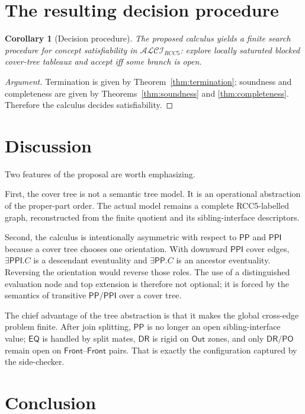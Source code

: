 \documentclass[11pt]{article}
\newtheorem{corollary}[definition]{Corollary}
\theoremstyle{remark}
\newcommand{\DR}{\mathsf{DR}}
\newcommand{\PO}{\mathsf{PO}}
\newcommand{\PP}{\mathsf{PP}}
\newcommand{\PPI}{\mathsf{PPI}}
\newcommand{\EQ}{\mathsf{EQ}}
\newcommand{\Out}{\mathsf{Out}}
\newcommand{\Front}{\mathsf{Front}}
\begin{document}
\section{The resulting decision procedure}

\begin{corollary}[Decision procedure]\label{cor:decision-procedure}
The proposed calculus yields a finite search procedure for concept satisfiability in $\mathcal{ALCI}_{RCC5}$: explore locally saturated blocked cover-tree tableaux and accept iff some branch is open.
\end{corollary}

\begin{proof}[Argument]
Termination is given by Theorem~\ref{thm:termination}; soundness and completeness are given by Theorems~\ref{thm:soundness} and \ref{thm:completeness}. Therefore the calculus decides satisfiability.
\end{proof}

\section{Discussion}

Two features of the proposal are worth emphasizing.

First, the cover tree is not a semantic tree model. It is an operational abstraction of the proper-part order. The actual model remains a complete RCC5-labelled graph, reconstructed from the finite quotient and its sibling-interface descriptors.

Second, the calculus is intentionally asymmetric with respect to $\PP$ and $\PPI$ because a cover tree chooses one orientation. With downward $\PPI$ cover edges, $\exists\PPI.C$ is a descendant eventuality and $\exists\PP.C$ is an ancestor eventuality. Reversing the orientation would reverse those roles. The use of a distinguished evaluation node and top extension is therefore not optional; it is forced by the semantics of transitive $\PP/\PPI$ over a cover tree.

The chief advantage of the tree abstraction is that it makes the global cross-edge problem finite. After join splitting, $\PP$ is no longer an open sibling-interface value; $\EQ$ is handled by split mates, $\DR$ is rigid on $\Out$ zones, and only $\DR/\PO$ remain open on $\Front$--$\Front$ pairs. That is exactly the configuration captured by the side-checker.

\section{Conclusion}
\end{document}
